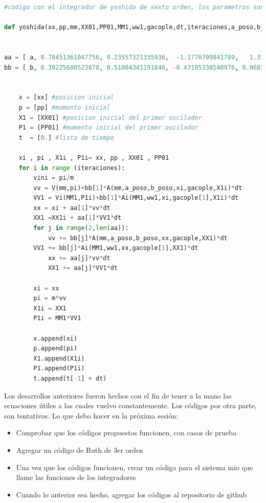 \documentclass[idxtotoc,hyperref,openany]{labbook} %
\begin{document}
\begin{lstlisting}[language=Python]
#codigo con el integrador de yoshida de sexto orden, los parametros son xx=posicion inicial, pp=momento inicial, XX01=posicion inicial del primer oscilador, PP01=momento inicial del primer oscilador, MM1=masa del primer  oscilador, ww1=frecuencia del primer oscilador, gacople= lista de los acoples para cada oscilador, dt= paso del integrador, iteraciones= numero de iteraciones del integrador, a_poso=parametro a del poso, b_poso=parametro b del poso, 

def yoshida(xx,pp,mm,XX01,PP01,MM1,ww1,gacople,dt,iteraciones,a_poso,b_poso):  #defino funcion con el integrador simplectico yoshida de 6to orden


aa = [ a, 0.78451361047756, 0.23557321335936,  -1.1776799841789,   1.3151863206839,  -1.1776799841789,  0.23557321335936, 0.78451361047756, 0]
bb = [ b, 0.39225680523878, 0.51004341191846, -0.47105338540976, 0.068753168252520, 0.068753168252520, -0.47105338540976, 0.51004341191846, 0.39225680523878]

    
    x = [xx] #posicion inicial
    p = [pp] #momento inicial
    X1 = [XX01] #posicion inicial del primer oscilador
    P1 = [PP01] #momento inicial del primer oscilador
    t  = [0.] #lista de tiempo
    
    xi , pi , X1i , P1i= xx, pp , XX01 , PP01
    for i in range (iteraciones):
        vini = pi/m
        vv = V(mm,pi)+bb[1]*A(mm,a_poso,b_poso,xi,gacople,X1i)*dt
        VV1 = Vi(MM1,P1i)+bb[1]*Ai(MM1,ww1,xi,gacople[1],X1i)*dt
        xx = xi + aa[1]*vv*dt
        XX1 =XX1i + aa[1]*VV1*dt 
        for j in range(2,len(aa)):
            vv += bb[j]*A(mm,a_poso,b_poso,xx,gacople,XX1)*dt
	    VV1 += bb[j]*Ai(MM1,ww1,xx,gacople[1],XX1)*dt
            xx += aa[j]*vv*dt
            XX1 += aa[j]*VV1*dt

        xi = xx
        pi = m*vv
        X1i = XX1
        P1i = MM1*VV1

        x.append(xi)
        p.append(pi)
        X1.append(X1i)
        P1.append(P1i) 
        t.append(t[-1] + dt)
 \end{lstlisting}   
        
Los desarrollos anteriores fueron hechos con el fin de tener a la mano las ecuaciones útiles a las cuales vuelvo constantemente. Los códigos por otra parte, son tentativos.
Lo que debo hacer en la próxima sesión:
\begin{itemize}
\item Comprobar que los códigos propuestos funcionen, con casos de prueba
\item Agregar un código de Ruth de 3er orden
\item Una vez que los códigos funcionen, crear un código para el sistema mio que llame las funciones de los integradores
\item Cuando lo anterior sea hecho, agregar los códigos al repositorio de github
\end{itemize}
\end{document}
